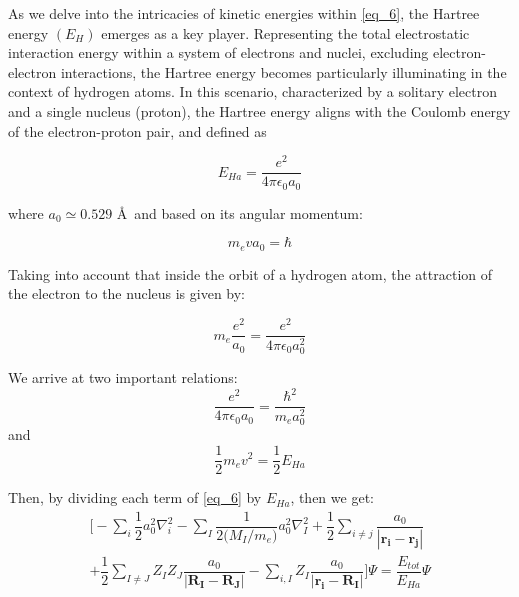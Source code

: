 As we delve into the intricacies of kinetic energies within \ref{eq_6}, the Hartree energy $\left(E_{H} \right)$ emerges as a key player. Representing the total electrostatic interaction energy within a system of electrons and nuclei, excluding electron-electron interactions, the Hartree energy becomes particularly illuminating in the context of hydrogen atoms. In this scenario, characterized by a solitary electron and a single nucleus (proton), the Hartree energy aligns with the Coulomb energy of the electron-proton pair, and defined as 

\begin{equation}
    E_{Ha}=\dfrac{e^{2}}{4\pi\epsilon_{0}a_{0}}
\end{equation}

where $a_0 \simeq 0.529$ \AA \ and based on its  angular momentum:

\begin{equation}
    m_{e}v a_{0} = \hbar  
\end{equation}

Taking into account that inside the orbit of a hydrogen atom, the attraction of the electron to the nucleus is given by:

\begin{equation}
    m_e \dfrac{e^{2}}{a_{0}}= \dfrac{e^{2}}{4 \pi \epsilon_{0} a_{0}^{2}}
\end{equation}

We arrive at two important relations:
\begin{equation}
    \dfrac{e^{2}}{4\pi\epsilon_{0}a_{0}}=\dfrac{\hbar^{2}}{m_{e} a_{0}^{2}}
\end{equation}
and
\begin{equation}
    \dfrac{1}{2}m_{e}v^{2} = \dfrac{1}{2} E_{Ha}
\end{equation}

Then, by dividing each term of \ref{eq_6} by $E_{Ha}$, then we get:
\begin{equation} \label{eq_12}
\begin{split}
    \Biggl[-\sum_{i} \dfrac{1}{2}a_{0}^{2}\nabla_{i}^{2} -\sum_{I} \dfrac{1}{2\bigl(M_{I}/m_e\bigr)}a_{0}^{2}\nabla_{I}^{2} + \dfrac{1}{2}\sum_{i\neq j}\dfrac{a_{0}}{|\mathbf{r_i}-\mathbf{r_j}|} \\
    +\dfrac{1}{2} \sum_{I\neq J}Z_{I}Z_{J} \dfrac{a_{0}}{|\mathbf{R_I}-\mathbf{R_J}|}-\sum_{i,I}Z_{I}\dfrac{a_{0}}{|\mathbf{r_i}-\mathbf{R_I}|} \Biggr] \Psi = \dfrac{E_{tot}}{E_{Ha}} \Psi
\end{split}
\end{equation}

